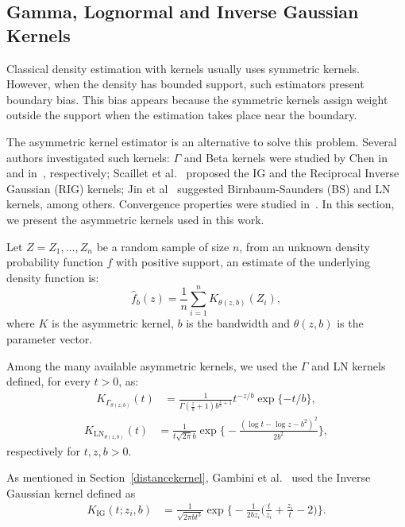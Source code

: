 \documentclass[twocolumn]{svjour3}
\begin{document}
	\subsection{Gamma, Lognormal and Inverse Gaussian Kernels}
	\label{asymmetrickernel}
	
	Classical density estimation with kernels usually uses symmetric kernels. 
	However, when the density has bounded support, such estimators present boundary bias. 
	This bias appears because the symmetric kernels assign weight outside the support when the estimation takes place near the boundary.
	
	The asymmetric kernel estimator is an alternative to solve this problem. Several authors investigated such kernels: 
	$\Gamma$ and Beta kernels were studied by Chen in~\cite{chensx2000} and in~\cite{chen1999}, respectively; 
	Scaillet et al.~\cite{Scaillet2004} proposed the IG and the Reciprocal Inverse Gaussian (RIG) kernels; 
	Jin et al~\cite{Jin2003} suggested Birnbaum-Saunders (BS) and LN kernels, among others. 
	Convergence properties were studied in~\cite{bouezmarni2005,libengue2013}. In this section, we present the asymmetric kernels used in this work.
	
	Let $ Z = Z_1,\dots, Z_n$ be a random sample of size $n$, from an unknown density probability function $f$ with positive support, an estimate of the underlying density function is:
	$$
	\widehat{f}_b(z)=\frac{1}{n}\sum_{i=1}^n K_{\theta(z,b)}(Z_i),
	$$ 
	where $K$ is the asymmetric kernel, $b$ is the bandwidth and ${\theta}(z,b)$ is the parameter vector.
	
	Among the many available asymmetric kernels, we used the $\Gamma$ and LN kernels defined, for every $t>0$, as:
	\begin{align}
	K_{{\Gamma}_{{\theta}(z,b)}}(t) & =\frac{1}{\Gamma(\frac{z}{b}+1)b^{\frac{z}{b}+1}} t^{-{z}/{b}} \exp\{-{t}/{b}\},
	\label{gammakernel}
	\end{align}
	\begin{align}
	K_{{\text{{LN}}}_{{\theta}(z,b)}}(t) & =\frac{1}{t \sqrt{2 \pi} b} \exp\Big\{-\frac{\left(\log t - \log z -b^2\right)^2}{2b^2}\Big\},
	\label{LNkernel}
	\end{align}
	respectively for $t,z,b>0$.
	
	As mentioned in Section~\ref{distancekernel}, Gambini et al.~\cite{gambini2015} used the Inverse Gaussian kernel defined as
	\begin{align}
	K_{\text{IG}}( t; z_i,b) & =\frac{1}{\sqrt{2\pi b t^3}} 
	\exp\Big\{-\frac{1}{2b z_i} \Big(\frac{t}{z_i}+\frac{z_i}{t}-2\Big)\Big\}.
	\end{align}
	
\end{document}
